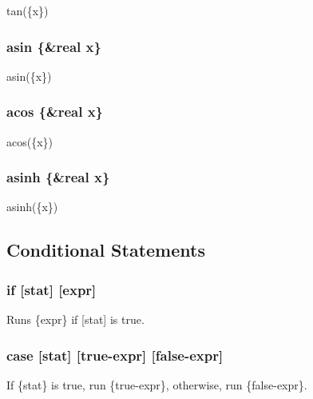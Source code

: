 \documentclass{article}
\begin{document}
	tan(\{x\})
	
	\subsubsection{asin \{\&real x\}}
	
	asin(\{x\})
	
	\subsubsection{acos \{\&real x\}}
	
	acos(\{x\})
	
	\subsubsection{asinh \{\&real x\}}
	
	asinh(\{x\})
	
	\newpage
	\subsection{Conditional Statements}
	
	\subsubsection{if [stat] [expr]}
	
	Runs \{expr\} if [stat] is true.
	
	\subsubsection{case [stat] [true-expr] [false-expr]}
	
	If \{stat\} is true, run \{true-expr\}, otherwise, run \{false-expr\}.
\end{document}
